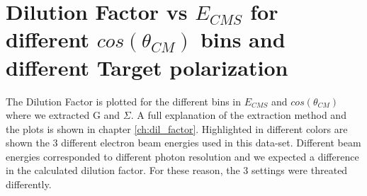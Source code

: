 \begin{figure}[htb]
\ContinuedFloat
  \begin{center} 
  \end{center}
\end{figure}



\clearpage
\newpage

\section{Dilution Factor vs \texorpdfstring{$E_{CMS}$}{E-CMS} for different \texorpdfstring{$cos(\theta_{CM})$}{cos(theta-CM)} bins and different Target polarization}
\label{app:dilfactor}
The Dilution Factor is plotted  for the different bins in $E_{CMS}$ and $cos(\theta_{CM})$ where we extracted G and $\Sigma$. A full explanation of the extraction method and the plots is shown in chapter \ref{ch:dil_factor}. Highlighted in different colors are shown the 3 different electron beam energies used in this data-set. Different beam energies corresponded to different photon resolution and we expected a difference in the calculated dilution factor. For these reason, the 3 settings were threated differently. 
\begin{figure}[htb]
  \begin{center}
     \\
  \end{center}
\end{figure}
